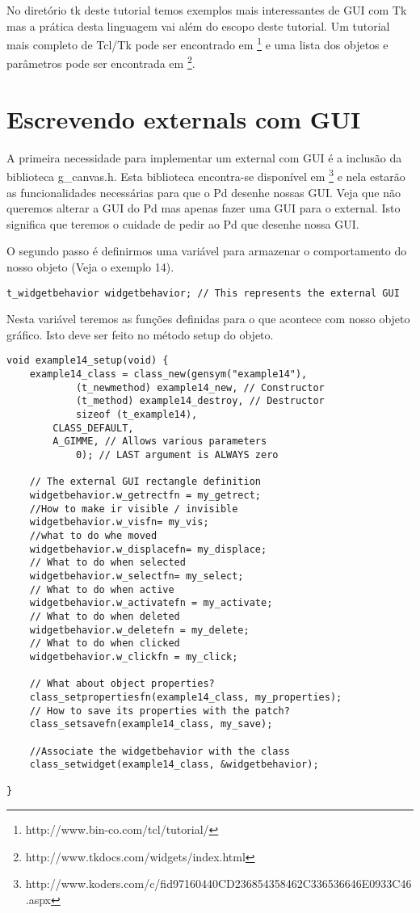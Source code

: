 No diretório tk deste tutorial temos exemplos mais interessantes de GUI com Tk mas a prática desta linguagem
vai além do escopo deste tutorial. Um tutorial mais completo de Tcl/Tk pode ser encontrado em 
\footnote{http://www.bin-co.com/tcl/tutorial/} e uma lista dos objetos e parâmetros pode ser encontrada em
\footnote{http://www.tkdocs.com/widgets/index.html}.

\section{Escrevendo externals com GUI}

A primeira necessidade para implementar um external com GUI é a inclusão da biblioteca g\_canvas.h. Esta biblioteca
encontra-se disponível em \footnote{http://www.koders.com/c/fid97160440CD236854358462C336536646E0933C46.aspx} e nela estarão
as funcionalidades necessárias para que o Pd desenhe nossas GUI. Veja que não queremos alterar a GUI do Pd mas
apenas fazer uma GUI para o external. Isto significa que teremos o cuidade de pedir ao Pd que desenhe nossa GUI.

O segundo passo é definirmos uma variável para armazenar o comportamento do nosso objeto (Veja o exemplo 14).

\begin{lstlisting}
t_widgetbehavior widgetbehavior; // This represents the external GUI
\end{lstlisting}

Nesta variável teremos as funções definidas para o que acontece com nosso objeto gráfico. Isto deve ser 
feito no método setup do objeto.

\begin{lstlisting}
void example14_setup(void) {
    example14_class = class_new(gensym("example14"),
            (t_newmethod) example14_new, // Constructor
            (t_method) example14_destroy, // Destructor
            sizeof (t_example14),
	    CLASS_DEFAULT,
	    A_GIMME, // Allows various parameters
            0); // LAST argument is ALWAYS zero

    // The external GUI rectangle definition
    widgetbehavior.w_getrectfn = my_getrect;
    //How to make ir visible / invisible
    widgetbehavior.w_visfn= my_vis;
    //what to do whe moved
    widgetbehavior.w_displacefn= my_displace;
    // What to do when selected
    widgetbehavior.w_selectfn= my_select;
    // What to do when active
    widgetbehavior.w_activatefn = my_activate;
    // What to do when deleted
    widgetbehavior.w_deletefn = my_delete;
    // What to do when clicked
    widgetbehavior.w_clickfn = my_click;

    // What about object properties?
    class_setpropertiesfn(example14_class, my_properties);
    // How to save its properties with the patch?
    class_setsavefn(example14_class, my_save);

    //Associate the widgetbehavior with the class
    class_setwidget(example14_class, &widgetbehavior);

}
\end{lstlisting}


